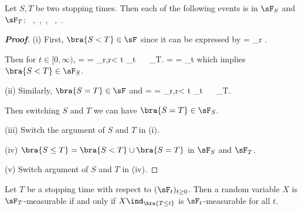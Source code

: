 \begin{proposition}
Let $S,T$ be two stopping times. Then each of the following events is in $\sF_S$ and $\sF_T$:
\be
{}\ ,\quad{}\ ,\quad {}\ , \quad {}\  ,\quad{}\ .
\ee
\end{proposition}

\begin{proof}[\bf Proof]
\ben
\item [(i)] First, $\bra{S<T}\in \sF$ since it can be expressed by
\be
{} = \bigcup_{r\in \Q} .
\ee

Then for $t\in [0,\infty)$,
\be
{} \cap {} =  = \bigcup_{r\in \Q,r< t} \cap {} \in \sF_t \ \ra \   \in \sF_T.
\ee
\be
{} \cap {} =   \cup {} =  \cup {} \in \sF_t \nonumber
\ee
which implies $\bra{S<T}  \in \sF_S$.

\item [(ii)] Similarly, $\bra{S=T}\in \sF$ and
\be
{}\cap {} =  = \bigcup_{r\in \Q,r< t} \cap {} \in \sF_t \ \ra \   \in \sF_T.
\ee

Then switching $S$ and $T$ we can have $\bra{S=T}  \in \sF_S$.

\item [(iii)] Switch the argument of $S$ and $T$ in (i).

\item [(iv)] $\bra{S\leq T} = \bra{S<T}\cup\bra{S=T}$ in $\sF_S$ and $\sF_T$.
\item [(v)] Switch argument of $S$ and $T$ in (iv).
\een
\end{proof}


\begin{proposition}\label{pro:random_variable_stopping_time_measurable}
Let $T$ be a stopping time with respect to $(\sF_t)_{t\geq 0}$. Then a random variable $X$ is $\sF_T$-measurable if and only if $X\ind_{\bra{T \leq t}}$ is $\sF_t$-measurable for all $t$.
\end{proposition}

